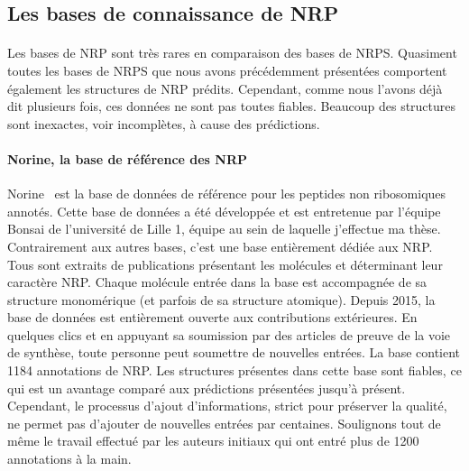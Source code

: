 \documentclass[12pt,french,twoside]{report}
\begin{document}
\subsection{Les bases de connaissance de NRP}

\label{bdd_nrp}

\paragraph{}Les bases de NRP sont très rares en comparaison des bases de NRPS.
Quasiment toutes les bases de NRPS que nous avons précédemment présentées comportent également les structures de NRP prédits.
Cependant, comme nous l'avons déjà dit plusieurs fois, ces données ne sont pas toutes fiables.
Beaucoup des structures sont inexactes, voir incomplètes, à cause des prédictions.

\paragraph{Norine, la base de référence des NRP}
Norine~\cite{caboche_norine:_2008,flissi_norine_2016} est la base de données de référence pour les peptides non ribosomiques annotés.
Cette base de données a été développée et est entretenue par l'équipe Bonsai de l'université de Lille 1, équipe au sein de laquelle j'effectue ma thèse.
Contrairement aux autres bases, c'est une base entièrement dédiée aux NRP.
Tous sont extraits de publications présentant les molécules et déterminant leur caractère NRP.
Chaque molécule entrée dans la base est accompagnée de sa structure monomérique (et parfois de sa structure atomique).
Depuis 2015, la base de données est entièrement ouverte aux contributions extérieures.
En quelques clics et en appuyant sa soumission par des articles de preuve de la voie de synthèse, toute personne peut soumettre de nouvelles entrées.
La base contient 1184 annotations de NRP.
Les structures présentes dans cette base sont fiables, ce qui est un avantage comparé aux prédictions présentées jusqu'à présent.
Cependant, le processus d'ajout d'informations, strict pour préserver la qualité, ne permet pas d'ajouter de nouvelles entrées par centaines.
Soulignons tout de même le travail effectué par les auteurs initiaux qui ont entré plus de 1200 annotations à la main.
\end{document}
